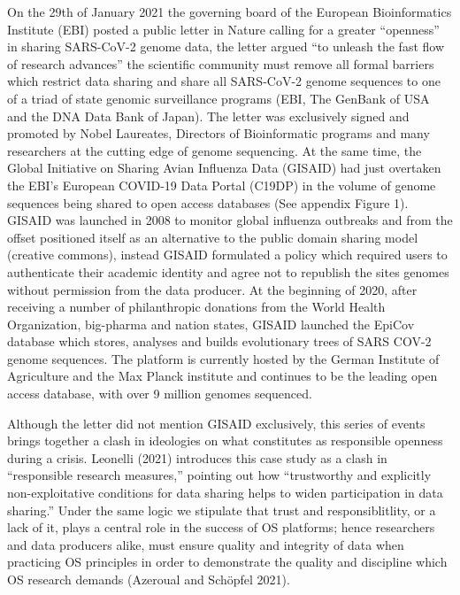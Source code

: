 \documentclass{article}
\begin{document}
On the 29th of January 2021 the governing board of the European
Bioinformatics Institute (EBI) posted a public letter in Nature calling
for a greater ``openness'' in sharing SARS-CoV-2 genome data, the letter
argued ``to unleash the fast flow of research advances'' the scientific
community must remove all formal barriers which restrict data sharing
and share all SARS-CoV-2 genome sequences to one of a triad of state
genomic surveillance programs (EBI, The GenBank of USA and the DNA Data
Bank of Japan). The letter was exclusively signed and promoted by Nobel
Laureates, Directors of Bioinformatic programs and many researchers at
the cutting edge of genome sequencing. At the same time, the Global
Initiative on Sharing Avian Influenza Data (GISAID) had just overtaken
the EBI's European COVID-19 Data Portal (C19DP) in the volume of genome
sequences being shared to open access databases (See appendix Figure 1).
GISAID was launched in 2008 to monitor global influenza outbreaks and
from the offset positioned itself as an alternative to the public domain
sharing model (creative commons), instead GISAID formulated a policy
which required users to authenticate their academic identity and agree
not to republish the sites genomes without permission from the data
producer. At the beginning of 2020, after receiving a number of
philanthropic donations from the World Health Organization, big-pharma
and nation states, GISAID launched the EpiCov database which stores,
analyses and builds evolutionary trees of SARS COV-2 genome sequences.
The platform is currently hosted by the German Institute of Agriculture
and the Max Planck institute and continues to be the leading open access
database, with over 9 million genomes sequenced.

Although the letter did not mention GISAID exclusively, this series of
events brings together a clash in ideologies on what constitutes as
responsible openness during a crisis. Leonelli (2021) introduces this
case study as a clash in ``responsible research measures,'' pointing out
how ``trustworthy and explicitly non-exploitative conditions for data
sharing helps to widen participation in data sharing.'' Under the same
logic we stipulate that trust and responsiblitlity, or a lack of it,
plays a central role in the success of OS platforms; hence researchers
and data producers alike, must ensure quality and integrity of data when
practicing OS principles in order to demonstrate the quality and
discipline which OS research demands (Azeroual and Schöpfel 2021).
\end{document}
